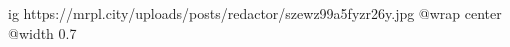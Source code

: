  
 
 
 
 

\ifcmt
  ig https://mrpl.city/uploads/posts/redactor/szewz99a5fyzr26y.jpg
  @wrap center
  @width 0.7
\fi
